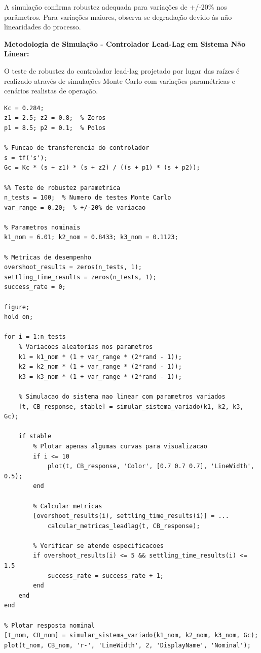 \documentclass[a4paper,12pt]{article}
\begin{document}
A simulação confirma robustez adequada para variações de +/-20\% nos parâmetros. Para variações maiores, observa-se degradação devido às não linearidades do processo.

\textbf{Metodologia de Simulação - Controlador Lead-Lag em Sistema Não Linear:}

O teste de robustez do controlador lead-lag projetado por lugar das raízes é realizado através de simulações Monte Carlo com variações paramétricas e cenários realistas de operação.

\begin{lstlisting}[caption=Simulacao de robustez - Controlador Lead-Lag]
%% Parametros do controlador Lead-Lag projetado
Kc = 0.284;
z1 = 2.5; z2 = 0.8;  % Zeros
p1 = 8.5; p2 = 0.1;  % Polos

% Funcao de transferencia do controlador
s = tf('s');
Gc = Kc * (s + z1) * (s + z2) / ((s + p1) * (s + p2));

%% Teste de robustez parametrica
n_tests = 100;  % Numero de testes Monte Carlo
var_range = 0.20;  % +/-20% de variacao

% Parametros nominais
k1_nom = 6.01; k2_nom = 0.8433; k3_nom = 0.1123;

% Metricas de desempenho
overshoot_results = zeros(n_tests, 1);
settling_time_results = zeros(n_tests, 1);
success_rate = 0;

figure;
hold on;

for i = 1:n_tests
    % Variacoes aleatorias nos parametros
    k1 = k1_nom * (1 + var_range * (2*rand - 1));
    k2 = k2_nom * (1 + var_range * (2*rand - 1));
    k3 = k3_nom * (1 + var_range * (2*rand - 1));
    
    % Simulacao do sistema nao linear com parametros variados
    [t, CB_response, stable] = simular_sistema_variado(k1, k2, k3, Gc);
    
    if stable
        % Plotar apenas algumas curvas para visualizacao
        if i <= 10
            plot(t, CB_response, 'Color', [0.7 0.7 0.7], 'LineWidth', 0.5);
        end
        
        % Calcular metricas
        [overshoot_results(i), settling_time_results(i)] = ...
            calcular_metricas_leadlag(t, CB_response);
        
        % Verificar se atende especificacoes
        if overshoot_results(i) <= 5 && settling_time_results(i) <= 1.5
            success_rate = success_rate + 1;
        end
    end
end

% Plotar resposta nominal
[t_nom, CB_nom] = simular_sistema_variado(k1_nom, k2_nom, k3_nom, Gc);
plot(t_nom, CB_nom, 'r-', 'LineWidth', 2, 'DisplayName', 'Nominal');


\end{lstlisting}
\end{document}

